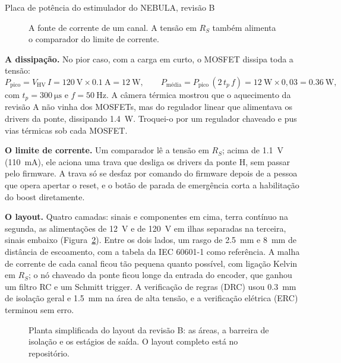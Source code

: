 \begin{atividade}{Placa de potência do estimulador do NEBULA, revisão B}
\begin{desenvolvimento}
\begin{figure}[htbp]
  \centering
  
  \caption{A fonte de corrente de um canal. A tensão em $R_S$ também alimenta o comparador do limite de
    corrente.}
  \label{fig:ex-fonte}
\end{figure}

\textbf{A dissipação.} No pior caso, com a carga em curto, o MOSFET dissipa toda a tensão:
\begin{equation}
  P_\mathrm{pico} = V_\mathrm{HV}\, I = \SI{120}{\volt} \times \SI{0,1}{\ampere} = \SI{12}{\watt},
  \qquad
  P_\text{média} = P_\mathrm{pico}\, (2\, t_p\, f) = \SI{12}{\watt} \times 0{,}03 = \SI{0,36}{\watt},
  \label{eq:ex-potencia}
\end{equation}
com $t_p = \SI{300}{\micro\second}$ e $f = \SI{50}{\hertz}$. A câmera térmica mostrou que o
aquecimento da revisão A não vinha dos MOSFETs, mas do regulador linear que alimentava os drivers da
ponte, dissipando \SI{1,4}{\watt}. Troquei-o por um regulador chaveado e pus vias térmicas sob cada
MOSFET.

\textbf{O limite de corrente.} Um comparador lê a tensão em $R_S$; acima de \SI{1,1}{\volt}
(\SI{110}{\milli\ampere}), ele aciona uma trava que desliga os drivers da ponte H, sem passar pelo
firmware. A trava só se desfaz por comando do firmware depois de a pessoa que opera apertar o reset,
e o botão de parada de emergência corta a habilitação do boost diretamente.

\textbf{O layout.} Quatro camadas: sinais e componentes em cima, terra contínuo na segunda, as
alimentações de \SI{12}{\volt} e de \SI{120}{\volt} em ilhas separadas na terceira, sinais embaixo
(Figura~\ref{fig:ex-layout}). Entre os dois lados, um rasgo de \SI{2,5}{\milli\meter} e
\SI{8}{\milli\meter} de distância de escoamento, com a tabela da IEC 60601-1 como referência. A malha de
corrente de cada canal ficou tão pequena quanto possível, com ligação Kelvin em $R_S$; o nó chaveado
da ponte ficou longe da entrada do encoder, que ganhou um filtro RC e um Schmitt trigger. A verificação
de regras (DRC) usou \SI{0,3}{\milli\meter} de isolação geral e \SI{1,5}{\milli\meter} na área de alta
tensão, e a verificação elétrica (ERC) terminou sem erro.

\begin{figure}[htbp]
  \centering
  
  \caption{Planta simplificada do layout da revisão B: as áreas, a barreira de isolação e os estágios
    de saída. O layout completo está no repositório.}
  \label{fig:ex-layout}
\end{figure}
\end{desenvolvimento}


\end{atividade}
